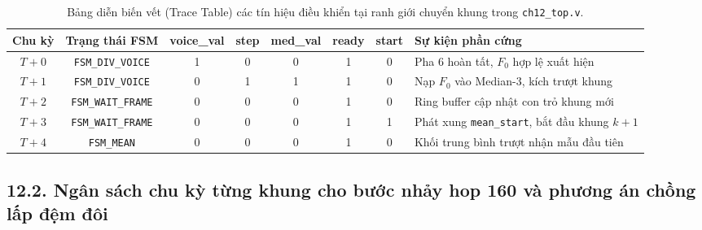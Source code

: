 \begin{table}[htbp]
\centering
\scriptsize
\caption{Bảng diễn biến vết (Trace Table) các tín hiệu điều khiển tại ranh giới chuyển khung trong \texttt{ch12\_top.v}.}
\label{tab:ch12_fsm_trace}
\begin{tabularx}{\linewidth}{|c|c|c|c|c|c|c|X|}
\hline
\textbf{Chu kỳ} & \textbf{Trạng thái FSM} & \textbf{voice\_val} & \textbf{step} & \textbf{med\_val} & \textbf{ready} & \textbf{start} & \textbf{Sự kiện phần cứng} \\
\hline
$T + 0$ & \texttt{FSM\_DIV\_VOICE} & 1 & 0 & 0 & 1 & 0 & Pha 6 hoàn tất, $F_0$ hợp lệ xuất hiện \\
$T + 1$ & \texttt{FSM\_DIV\_VOICE} & 0 & 1 & 1 & 1 & 0 & Nạp $F_0$ vào Median-3, kích trượt khung \\
$T + 2$ & \texttt{FSM\_WAIT\_FRAME} & 0 & 0 & 0 & 1 & 0 & Ring buffer cập nhật con trỏ khung mới \\
$T + 3$ & \texttt{FSM\_WAIT\_FRAME} & 0 & 0 & 0 & 1 & 1 & Phát xung \texttt{mean\_start}, bắt đầu khung $k+1$ \\
$T + 4$ & \texttt{FSM\_MEAN} & 0 & 0 & 0 & 1 & 0 & Khối trung bình trượt nhận mẫu đầu tiên \\
\hline
\end{tabularx}
\end{table}

\subsection*{12.2. Ngân sách chu kỳ từng khung cho bước nhảy hop 160 và phương án chồng lấp đệm đôi}

